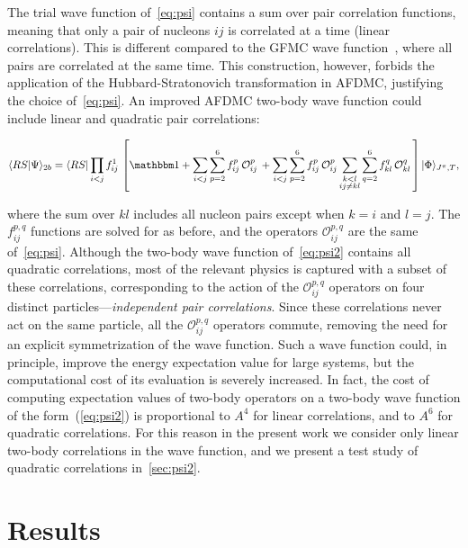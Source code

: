 \documentclass[aps,prc,twocolumn,superscriptaddress,floatfix]{revtex4-1}
\begin{document}
The trial wave function of~\cref{eq:psi} contains a sum over pair correlation functions, 
meaning that only a pair of nucleons $ij$ is correlated at a time (linear correlations).
This is different compared to the GFMC wave function~\cite{Carlson:2015}, 
where all pairs are correlated at the same time. This construction, however, forbids the 
application of the Hubbard-Stratonovich transformation in AFDMC, justifying the choice
of~\cref{eq:psi}. An improved AFDMC two-body wave function could include linear and
quadratic pair correlations: 
\begin{widetext}
\begin{align}
\langle RS|\Psi\rangle_{2b}=\langle RS|\prod_{i<j}f^1_{ij}\,
\left[\mathbbm1+\sum_{i<j}\sum_{p=2}^6 f^p_{ij}\,\mathcal O_{ij}^p\,
+\sum_{i<j}\sum_{p=2}^6 f^p_{ij}\,\mathcal O_{ij}^p \sum_{\substack{k<l\\ij\ne kl}}\sum_{q=2}^6 f^q_{kl}\,\mathcal O_{kl}^q\,\right]|\Phi\rangle_{J^\pi,T} ,
\label{eq:psi2}
\end{align}
\end{widetext}
where the sum over $kl$ includes all nucleon pairs except when $k=i$ and $l=j$. 
The $f^{p,q}_{ij}$ functions are solved for as before, and the operators 
$\mathcal{O}^{p,q}_{ij}$ are the same of~\cref{eq:psi}. 
Although the two-body wave function of~\cref{eq:psi2} contains all quadratic correlations, 
most of the relevant physics is captured with a subset of these correlations, corresponding
to the action of the $\mathcal O_{ij}^{p,q}$ operators on four distinct 
particles---\emph{independent pair correlations}. Since these correlations never act on the same 
particle, all the $\mathcal{O}^{p,q}_{ij}$ operators commute, removing the need for an explicit 
symmetrization of the wave function. Such a wave function could, in principle, improve
the energy expectation value for large systems, but the computational cost of its evaluation is
severely increased. In fact, the cost of computing expectation values of two-body operators on
a two-body wave function of the form~(\ref{eq:psi2}) is proportional to $A^4$ for linear correlations, 
and to $A^6$ for quadratic correlations.
For this reason in the present work we consider only linear two-body correlations in the wave function, 
and we present a test study of quadratic correlations in~\cref{sec:psi2}. 


\section{Results}
\label{sec:res}
\end{document}
